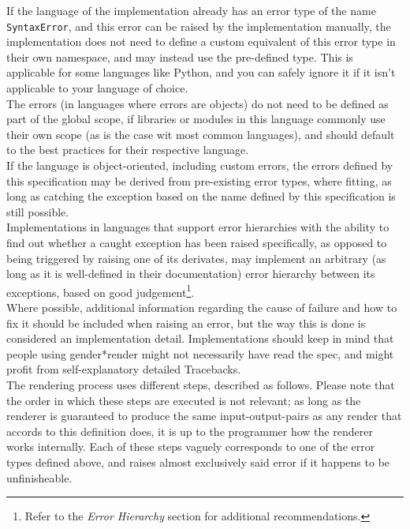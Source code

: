\documentclass{article}
\newcommand{\GenderRender}{
    gender*render
}
\begin{document}
    If the language of the implementation already has an error type of the name \texttt{SyntaxError}, and this error can be raised by the implementation manually, the implementation does not need to define a custom equivalent of this error type in their own namespace, and may instead use the pre-defined type.
    This is applicable for some languages like Python, and you can safely ignore it if it isn't applicable to your language of choice.\\
    The errors (in languages where errors are objects) do not need to be defined as part of the global scope, if libraries or modules in this language commonly use their own scope (as is the case wit most common languages), and should default to the best practices for their respective language.\\
    If the language is object-oriented, including custom errors, the errors defined by this specification may be derived from pre-existing error types, where fitting, as long as catching the exception based on the name defined by this specification is still possible.\\
    Implementations in languages that support error hierarchies with the ability to find out whether a caught exception has been raised specifically, as opposed to being triggered by raising one of its derivates, may implement an arbitrary (as long as it is well-defined in their documentation) error hierarchy between its exceptions, based on good judgement\footnote{Refer to the \emph{Error Hierarchy} section for additional recommendations.}.\\
    Where possible, additional information regarding the cause of failure and how to fix it should be included when raising an error, but the way this is done is considered an implementation detail.
    Implementations should keep in mind that people using \GenderRender might not necessarily have read the spec, and might profit from self-explanatory detailed Tracebacks.\\

    The rendering process uses different steps, described as follows.
    Please note that the order in which these steps are executed is not relevant;
    as long as the renderer is guaranteed to produce the same input-output-pairs as any render that accords to this definition does, it is up to the programmer how the renderer works internally.
    Each of these steps vaguely corresponds to one of the error types defined above, and raises almost exclusively said error if it happens to be unfinisheable.\\
\end{document}
